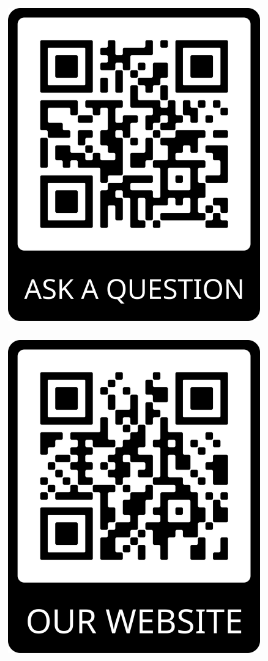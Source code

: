 \documentclass[aspectratio=169,hyperref={unicode}]{beamer}
\begin{document}
\begin{frame}
\begin{center}

\begin{minipage}{0.4\textwidth}
\centering
    \includegraphics[width=0.5\textwidth]{../QRqa.png}
  \end{minipage}
  \hfill
  \begin{minipage}{0.4\textwidth}
  \centering
    \includegraphics[width=0.5\textwidth]{../QRweb.png}
  \end{minipage}
\end{center}
\end{frame}
\end{document}
